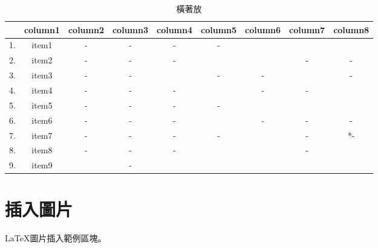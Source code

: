 \begin{landscape}
    \begin{table}[h]
    \caption{橫著放}
    \label{Tab:Commercial_App_Features_Comparison}
    \begin{center}               
    \begin{tabular}{|c|c|c|c|c|c|c|c|c|}
    \hline
       & column1  & column2  & column3 & column4 & column5 & column6 & column7 & column8 \\ \hline
    1. & item1    & -        & -       & -       & -       &     \color{red}{${\surd}$} &  \color{red}{${\surd}$}    &  \color{red}{${\surd}$}     \\ \hline
    2. & item2    & -        & -       & -       & \color{red}{${\surd}$}      & \color{red}{${\surd}$}     & -    & -     \\ \hline
    3. & item3    & -        & -       & \color{red}{${\surd}$} & -     &  -    &  \color{red}{${\surd}$}    & -     \\ \hline
    4. & item4    & -        & -       & -       &  \color{red}{${\surd}$}     &  -    & -    &      \color{red}{${\surd}$} \\ \hline
    5. & item5    & -        & -       & -       &  -   &    \color{red}{${\surd}$}  &  \color{red}{${\surd}$}    &  \color{red}{${\surd}$}     \\ \hline
    6. & item6    & -        & -       & -       &  \color{red}{${\surd}$}   &  -    & -    &      - \\ \hline
    7. & item7    & -        & -       & -       &  -     &  \color{red}{${\surd}$}    & -    &     *- \\ \hline
    8. & item8    & -        & -       & -       &   \color{red}{${\surd}$}    &   \color{red}{${\surd}$}   & -    &      \color{red}{${\surd}$} \\ \hline
    9. & item9    &  \color{red}{${\surd}$}    &  -    & \color{red}{${\surd}$}                  &   \color{red}{${\surd}$}    &   \color{red}{${\surd}$}   &  \color{red}{${\surd}$}    &  \color{red}{${\surd}$}     \\ \hline
    \end{tabular}
    \end{center}
    \end{table}
 \end{landscape}
 \clearpage

 \section{插入圖片}
 \LaTeX 圖片插入範例區塊。

